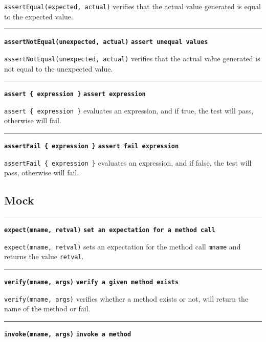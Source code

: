\documentclass[letterpaper,12pt]{article}
\begin{document}
\vspace{0.1cm}
\noindent
\texttt{assertEqual(expected, actual)} verifies that the actual value generated is equal to the expected value.

\bigskip
\hrule\vspace{0.1cm}
\noindent
{\tt\bf assertNotEqual(unexpected, actual)} \hfill {\tt\bf assert unequal values}

\vspace{0.1cm}
\noindent
\texttt{assertNotEqual(unexpected, actual)} verifies that the actual value generated is not equal to the unexpected value.

\bigskip
\hrule\vspace{0.1cm}
\noindent
{\tt\bf assert \{ expression \}} \hfill {\tt\bf assert expression}

\vspace{0.1cm}
\noindent
\texttt{assert \{ expression \}} evaluates an expression, and if true, the test will pass, otherwise will fail.

\bigskip
\hrule\vspace{0.1cm}
\noindent
{\tt\bf assertFail \{ expression \}} \hfill {\tt\bf assert fail expression}

\vspace{0.1cm}
\noindent
\texttt{assertFail \{ expression \}} evaluates an expression, and if false, the test will pass, otherwise will fail.

\newpage\subsection{Mock}

\bigskip
\hrule\vspace{0.1cm}
\noindent
{\tt\bf expect(mname, retval)} \hfill {\tt\bf set an expectation for a method call}

\vspace{0.1cm}
\noindent
\texttt{expect(mname, retval)} sets an expectation for the method call \texttt{mname} and returns the value \texttt{retval}.

\bigskip
\hrule\vspace{0.1cm}
\noindent
{\tt\bf verify(mname, args)} \hfill {\tt\bf verify a given method exists}

\vspace{0.1cm}
\noindent
\texttt{verify(mname, args)} verifies whether a method exists or not, will return the name of the method or fail.

\bigskip
\hrule\vspace{0.1cm}
\noindent
{\tt\bf invoke(mname, args)} \hfill {\tt\bf invoke a method}
\end{document}
